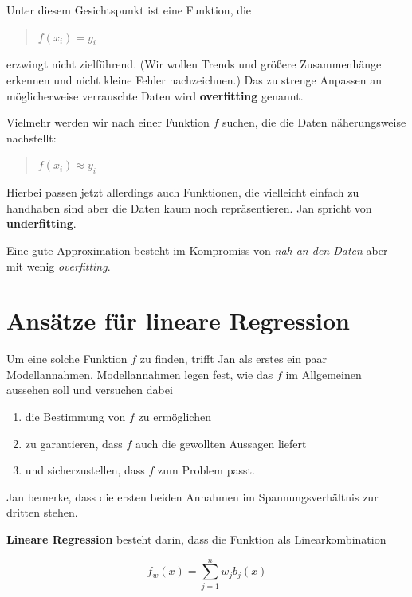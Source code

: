 \documentclass[]{book}
\theoremstyle{definition}
\theoremstyle{definition}
\theoremstyle{definition}
\theoremstyle{definition}
\theoremstyle{remark}
\begin{document}
Unter diesem Gesichtspunkt ist eine Funktion, die

\begin{quote}
\(f(x_i)=y_i\)
\end{quote}

erzwingt nicht zielführend. (Wir wollen Trends und größere Zusammenhänge erkennen und nicht kleine Fehler nachzeichnen.) Das zu strenge Anpassen an möglicherweise verrauschte Daten wird \textbf{overfitting} genannt.

Vielmehr werden wir nach einer Funktion \(f\) suchen, die die Daten näherungsweise nachstellt:

\begin{quote}
\(f(x_i)\approx y_i\)
\end{quote}

Hierbei passen jetzt allerdings auch Funktionen, die vielleicht einfach zu handhaben sind aber die Daten kaum noch repräsentieren. Jan spricht von \textbf{underfitting}.

Eine gute Approximation besteht im Kompromiss von \emph{nah an den Daten} aber mit wenig \emph{overfitting}.

\hypertarget{ansuxe4tze-fuxfcr-lineare-regression}{%
\section{Ansätze für lineare Regression}\label{ansuxe4tze-fuxfcr-lineare-regression}}

Um eine solche Funktion \(f\) zu finden, trifft Jan als erstes ein paar
Modellannahmen. Modellannahmen legen fest, wie das \(f\) im Allgemeinen
aussehen soll und versuchen dabei

\begin{enumerate}
\def\labelenumi{\arabic{enumi}.}
\item
  die Bestimmung von \(f\) zu ermöglichen
\item
  zu garantieren, dass \(f\) auch die gewollten Aussagen liefert
\item
  und sicherzustellen, dass \(f\) zum Problem passt.
\end{enumerate}

Jan bemerke, dass die ersten beiden Annahmen im Spannungsverhältnis zur
dritten stehen.

\textbf{Lineare Regression} besteht darin, dass die Funktion als Linearkombination

\begin{equation*}
f_w(x) = \sum_{j=1}^n w_j b_j(x)
\end{equation*}
\end{document}
